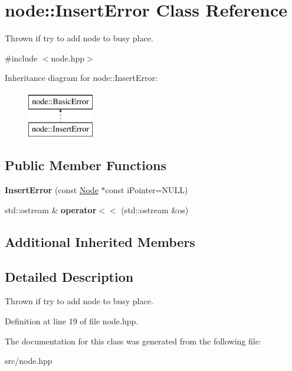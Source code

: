 \hypertarget{classnode_1_1InsertError}{\section{node\-:\-:Insert\-Error Class Reference}
\label{classnode_1_1InsertError}
}


Thrown if try to add node to busy place.  




{\ttfamily \#include $<$node.\-hpp$>$}

Inheritance diagram for node\-:\-:Insert\-Error\-:\begin{figure}[H]
\begin{center}
\leavevmode
\includegraphics[height=2.000000cm]{classnode_1_1InsertError}
\end{center}
\end{figure}
\subsection*{Public Member Functions}
\begin{DoxyCompactItemize}
\item 
\hypertarget{classnode_1_1InsertError_a72063653683422110d5736d16a7bf54e}{{\bfseries Insert\-Error} (const \hyperlink{classnode_1_1Node}{Node} $\ast$const i\-Pointer=N\-U\-L\-L)}\label{classnode_1_1InsertError_a72063653683422110d5736d16a7bf54e}

\item 
\hypertarget{classnode_1_1InsertError_adfdbe66e711c6986d0ed0ebbfb06b90f}{std\-::ostream \& {\bfseries operator$<$$<$} (std\-::ostream \&os)}\label{classnode_1_1InsertError_adfdbe66e711c6986d0ed0ebbfb06b90f}

\end{DoxyCompactItemize}
\subsection*{Additional Inherited Members}


\subsection{Detailed Description}
Thrown if try to add node to busy place. 

Definition at line 19 of file node.\-hpp.



The documentation for this class was generated from the following file\-:\begin{DoxyCompactItemize}
\item 
src/node.\-hpp\end{DoxyCompactItemize}
